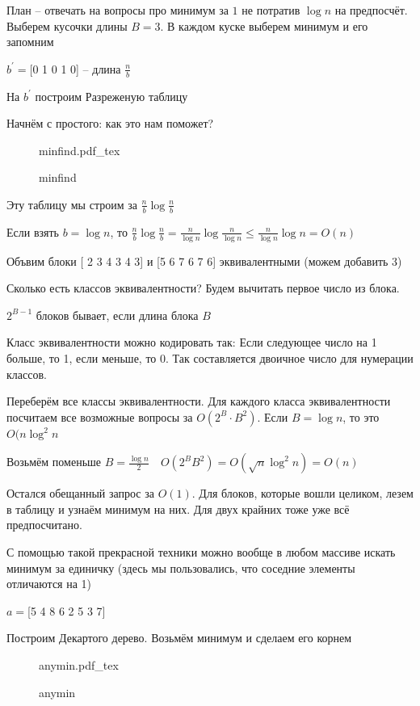 \documentclass{book}
\newcommand{\p}[1]{#1^{\prime}}
\theoremstyle{definition}
\newcommand{\incfig}[1]{%
    \def\svgwidth{\columnwidth}
    {#1.pdf_tex}
}
\begin{document}
План -- отвечать на вопросы про минимум за $1$ не потратив  $\log n$ на предпосчёт. Выберем кусочки длины $B = 3$. В каждом куске выберем минимум и его запомним

$\p b = $[0 1 0 1 0] -- длина  $\frac{n}{b}$ 

На $\p b$ построим Разреженую таблицу

Начнём с простого: как это нам поможет?

\begin{figure}[!ht]
    \centering
    \incfig{minfind}
    \caption{minfind}
    \label{fig:minfind}
\end{figure}

Эту таблицу мы строим за $\frac{n}{b}\log \frac{n}{b}$ 

Если взять $b = \log n$, то $\frac{n}{b}\log \frac{n}{b} = \frac{n}{\log n}\log \frac{n}{\log n} \leqslant \frac{n}{\log n}\log n = O(n)$

Объвим блоки [ 2 3 4 3 4 3] и [5 6 7 6 7 6] эквивалентными (можем добавить $3$)

Сколько есть классов эквивалентности? Будем вычитать первое число из блока.

$2^{B-1}$ блоков бывает, если длина блока  $B$

Класс эквивалентности можно кодировать так: Если следующее число на 1 больше, то 1, если меньше, то 0. Так составляется двоичное число для нумерации классов.

Переберём все классы эквивалентности. Для каждого класса эквивалентности посчитаем все возможные вопросы за  $O(2^B \cdot  B^2)$. Если $B = \log n$, то это $O(n\log ^2n$

Возьмём поменьше $B = \frac{\log n}{2}\quad O\left( 2^BB^2 \right)  = O(\sqrt{n}\log ^2n) = O(n) $

Остался обещанный запрос за $O(1)$. Для блоков, которые вошли целиком, лезем в таблицу и узнаём минимум на них. Для двух крайних тоже уже всё предпосчитано. 

 \begin{statement}
     С помощью такой прекрасной техники можно вообще в любом массиве искать минимум за единичку (здесь мы пользовались, что соседние элементы отличаются на 1)
\end{statement}

$a = $[5 4 8 6 2 5 3 7]

Построим Декартого дерево. Возьмём минимум и сделаем его корнем

\begin{figure}[!ht]
    \centering
    \incfig{anymin}
    \caption{anymin}
    \label{fig:anymin}
\end{figure}
\end{document}
